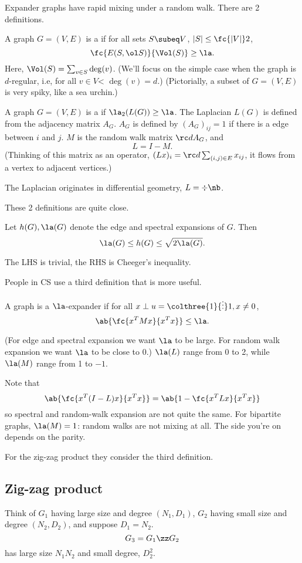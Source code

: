Expander graphs have rapid mixing under a random walk.
There are 2 definitions.
\begin{df}
A graph $G=(V,E)$ is a  if for all sets $S\subeq V$, $|S|\le \fc{|V|}2$, 
\[
\fc{E(S,\ol S)}{\Vol(S)}\ge \la.
\]
Here, $\Vol(S)=\sum_{v\in S}\deg(v)$. (We'll focus on the simple case when the graph is $d$-regular, i.e, for all $v\in V$< $\deg(v)=d$.) (Pictorially, a subset of $G=(V,E)$ is very spiky, like a sea urchin.)

A graph $G=(V,E)$ is a if $\la_2(L(G))\ge \la$. The Laplacian $L(G)$ is defined from the adjacency matrix $A_G$. $A_G$ is defined by $(A_G)_{ij}=1$ if there is a edge between $i$ and $j$. $M$ is the random walk matrix $\rc d A_G$, and 
\[
L=I-M.
\]
(Thinking of this matrix as an operator, $(Lx)_i=\rc d\sum_{(i,j)\in E}x_{ij}$, it flows from a vertex to adjacent vertices.)
\end{df}
The Laplacian originates in differential geometry, $L=\div \nb$.

These 2 definitions are quite close.
\begin{thm}
Let $h(G),\la(G)$ denote the edge and spectral expansions of $G$. Then
\[
\la(G)\le h(G)\le \sqrt{2\la(G)}.
\]
\end{thm}
The LHS is trivial, the RHS is Cheeger's inequality.

People in CS use a third definition that is more useful.
\begin{df}
A graph is a $\la$-expander if for all $x\perp u=\colthree{1}{\vdots}1,x\ne 0$, 
\[
\ab{\fc{x^TMx}{x^Tx}}\le \la.
\]
\end{df}
(For edge and spectral expansion we want $\la$ to be large. For random walk expansion we want $\la$ to be close to 0.) %
$\la(L)$ range from 0 to 2, while $\la(M)$ range from 1 to $-1$.

Note that 
\[
\ab{\fc{x^T(I-L)x}{x^Tx}}=\ab{1-\fc{x^TLx}{x^Tx}}
\]
so spectral and random-walk expansion are not quite the same. For bipartite graphs, $\la(M)=1$: random walks are not mixing at all. The side you're on depends on the parity.

For the zig-zag product they consider the third definition.

\subsection{Zig-zag product}

Think of $G_1$ having large size and degree $(N_1,D_1)$, $G_2$ having small size and degree $(N_2,D_2)$, and suppose $D_1=N_2$. 
\[
G_3=G_1\zz G_2
\]
has large size $N_1N_2$ and small degree, $D_2^2$.

